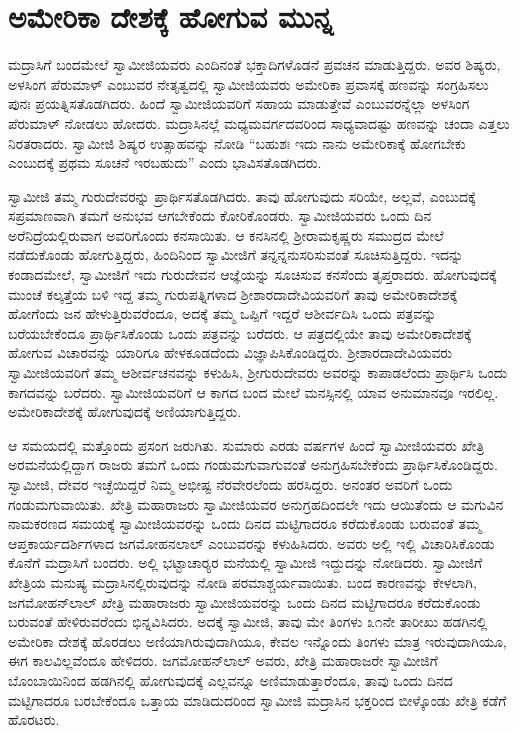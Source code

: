 
\chapter{ಅಮೇರಿಕಾ ದೇಶಕ್ಕೆ ಹೋಗುವ ಮುನ್ನ }

 ಮದ್ರಾಸಿಗೆ ಬಂದಮೇಲೆ ಸ್ವಾಮೀಜಿಯವರು ಎಂದಿನಂತೆ ಭಕ್ತಾದಿಗಳೊಡನೆ ಪ್ರವಚನ ಮಾಡುತ್ತಿದ್ದರು. ಅವರ ಶಿಷ್ಯರು, ಅಳಸಿಂಗ ಪೆರುಮಾಳ್ ಎಂಬುವರ ನೇತೃತ್ವದಲ್ಲಿ ಸ್ವಾಮೀಜಿಯವರು ಅಮೇರಿಕಾ ಪ್ರವಾಸಕ್ಕೆ ಹಣವನ್ನು ಸಂಗ್ರಹಿಸಲು ಪುನಃ ಪ್ರಯತ್ನಿಸತೊಡಗಿದರು. ಹಿಂದೆ ಸ್ವಾಮೀಜಿಯವರಿಗೆ ಸಹಾಯ ಮಾಡುತ್ತೇವೆ ಎಂಬುವರನ್ನೆಲ್ಲಾ ಅಳಸಿಂಗ ಪೆರುಮಾಳ್ ನೋಡಲು ಹೋದರು. ಮದ್ರಾಸಿನಲ್ಲೆ ಮಧ್ಯಮವರ್ಗದವರಿಂದ ಸಾಧ್ಯವಾದಷ್ಟು ಹಣವನ್ನು ಚಂದಾ ಎತ್ತಲು ನಿರತರಾದರು. ಸ್ವಾಮೀಜಿ ಶಿಷ್ಯರ ಉತ್ಸಾಹವನ್ನು ನೋಡಿ “ಬಹುಶಃ ಇದು ನಾನು ಅಮೇರಿಕಾಕ್ಕೆ ಹೋಗಬೇಕು ಎಂಬುದಕ್ಕೆ ಪ್ರಥಮ ಸೂಚನೆ ಇರಬಹುದು” ಎಂದು ಭಾವಿಸತೊಡಗಿದರು. 

 ಸ್ವಾಮೀಜಿ ತಮ್ಮ ಗುರುದೇವರನ್ನು ಪ್ರಾರ್ಥಿಸತೊಡಗಿದರು. ತಾವು ಹೋಗುವುದು ಸರಿಯೇ, ಅಲ್ಲವೆ, ಎಂಬುದಕ್ಕೆ ಸಪ್ರಮಾಣವಾಗಿ ತಮಗೆ ಅನುಭವ ಆಗಬೇಕೆಂದು ಕೋರಿಕೊಂಡರು. ಸ್ವಾಮೀಜಿಯವರು ಒಂದು ದಿನ ಅರೆನಿದ್ರೆಯಲ್ಲಿರುವಾಗ ಅವರಿಗೊಂದು ಕನಸಾಯಿತು. ಆ ಕನಸಿನಲ್ಲಿ ಶ‍್ರೀರಾಮಕೃಷ್ಣರು ಸಮುದ್ರದ ಮೇಲೆ ನಡೆದುಕೊಂಡು ಹೋಗುತ್ತಿದ್ದರು, ಹಿಂದಿನಿಂದ ಸ್ವಾಮೀಜಿಗೆ ತನ್ನನ್ನನುಸರಿಸುವಂತೆ ಸೂಚಿಸುತ್ತಿದ್ದರು. ಇದನ್ನು ಕಂಡಾದಮೇಲೆ, ಸ್ವಾಮೀಜಿಗೆ ಇದು ಗುರುದೇವನ ಆಜ್ಞೆಯನ್ನು ಸೂಚಿಸುವ ಕನಸೆಂದು ತೃಪ್ತರಾದರು. ಹೋಗುವುದಕ್ಕೆ ಮುಂಚೆ ಕಲ್ಕತ್ತೆಯ ಬಳಿ ಇದ್ದ ತಮ್ಮ ಗುರುಪತ್ನಿಗಳಾದ ಶ‍್ರೀಶಾರದಾದೇವಿಯವರಿಗೆ ತಾವು ಅಮೇರಿಕಾದೇಶಕ್ಕೆ ಹೋಗೆಂದು ಜನ ಹೇಳುತ್ತಿರುವರೆಂದೂ, ಅದಕ್ಕೆ ತಮ್ಮ ಒಪ್ಪಿಗೆ ಇದ್ದರೆ ಆಶೀರ್ವದಿಸಿ ಒಂದು ಪತ್ರವನ್ನು ಬರೆಯಬೇಕೆಂದೂ ಪ್ರಾರ್ಥಿಸಿಕೊಂಡು ಒಂದು ಪತ್ರವನ್ನು ಬರೆದರು. ಆ ಪತ್ರದಲ್ಲಿಯೇ ತಾವು ಅಮೇರಿಕಾದೇಶಕ್ಕೆ ಹೋಗುವ ವಿಚಾರವನ್ನು ಯಾರಿಗೂ ಹೇಳಕೂಡದೆಂದು ವಿಜ್ಞಾಪಿಸಿಕೊಂಡಿದ್ದರು. ಶ‍್ರೀಶಾರದಾದೇವಿಯವರು ಸ್ವಾಮೀಜಿಯವರಿಗೆ ತಮ್ಮ ಆಶೀರ್ವಚನವನ್ನು ಕಳುಹಿಸಿ, ಶ‍್ರೀಗುರುದೇವರು ಅವರನ್ನು ಕಾಪಾಡಲೆಂದು ಪ್ರಾರ್ಥಿಸಿ ಒಂದು ಕಾಗದವನ್ನು ಬರೆದರು. ಸ್ವಾಮೀಜಿಯವರಿಗೆ ಆ ಕಾಗದ ಬಂದ ಮೇಲೆ ಮನಸ್ಸಿನಲ್ಲಿ ಯಾವ ಅನುಮಾನವೂ ಇರಲಿಲ್ಲ. ಅಮೇರಿಕಾದೇಶಕ್ಕೆ ಹೋಗುವುದಕ್ಕೆ ಅಣಿಯಾಗುತ್ತಿದ್ದರು. 

 ಆ ಸಮಯದಲ್ಲಿ ಮತ್ತೊಂದು ಪ್ರಸಂಗ ಜರುಗಿತು. ಸುಮಾರು ಎರಡು ವರ್ಷಗಳ ಹಿಂದೆ ಸ್ವಾಮೀಜಿಯವರು ಖೇತ್ರಿ ಅರಮನೆಯಲ್ಲಿದ್ದಾಗ ರಾಜರು ತಮಗೆ ಒಂದು ಗಂಡುಮಗುವಾಗುವಂತೆ ಅನುಗ್ರಹಿಸಬೇಕೆಂದು ಪ್ರಾರ್ಥಿಸಿಕೊಂಡಿದ್ದರು. ಸ್ವಾಮೀಜಿ, ದೇವರ ಇಚ್ಛೆಯಿದ್ದರೆ ನಿಮ್ಮ ಅಭೀಷ್ಟ ನೆರವೇರಲೆಂದು ಹರಸಿದ್ದರು. ಅನಂತರ ಅವರಿಗೆ ಒಂದು ಗಂಡುಮಗುವಾಯಿತು. ಖೇತ್ರಿ ಮಹಾರಾಜರು ಸ್ವಾಮೀಜಿಯವರ ಅನುಗ್ರಹದಿಂದಲೇ ಇದು ಆಯಿತೆಂದು ಆ ಮಗುವಿನ ನಾಮಕರಣದ ಸಮಯಕ್ಕೆ ಸ್ವಾಮೀಜಿಯವರನ್ನು ಒಂದು ದಿನದ ಮಟ್ಟಿಗಾದರೂ ಕರೆದುಕೊಂಡು ಬರುವಂತೆ ತಮ್ಮ ಆಪ್ತಕಾರ್ಯದರ್ಶಿಗಳಾದ ಜಗಮೋಹನಲಾಲ್ ಎಂಬುವರನ್ನು ಕಳುಹಿಸಿದರು. ಅವರು ಅಲ್ಲಿ ಇಲ್ಲಿ ವಿಚಾರಿಸಿಕೊಂಡು ಕೊನೆಗೆ ಮದ್ರಾಸಿಗೆ ಬಂದರು. ಅಲ್ಲಿ ಭಟ್ಟಾಚಾರ‍್ಯರ ಮನೆಯಲ್ಲಿ ಸ್ವಾಮೀಜಿ ಇದ್ದುದನ್ನು ನೋಡಿದರು. ಸ್ವಾಮೀಜಿಗೆ ಖೇತ್ರಿಯ ಮನುಷ್ಯ ಮದ್ರಾಸಿನಲ್ಲಿರುವುದನ್ನು ನೋಡಿ ಪರಮಾಶ್ಚರ್ಯವಾಯಿತು. ಬಂದ ಕಾರಣವನ್ನು ಕೇಳಲಾಗಿ, ಜಗಮೋಹನ್‍ಲಾಲ್ ಖೇತ್ರಿ ಮಹಾರಾಜರು ಸ್ವಾಮೀಜಿಯವರನ್ನು ಒಂದು ದಿನದ ಮಟ್ಟಿಗಾದರೂ ಕರೆದುಕೊಂಡು ಬರುವಂತೆ ಹೇಳಿರುವರೆಂದು ಭಿನ್ನವಿಸಿದರು. ಅದಕ್ಕೆ ಸ್ವಾಮೀಜಿ, ತಾವು ಮೇ ತಿಂಗಳು ೩೧ನೇ ತಾರೀಖು ಹಡಗಿನಲ್ಲಿ ಅಮೇರಿಕಾ ದೇಶಕ್ಕೆ ಹೊರಡಲು ಅಣಿಯಾಗಿರುವುದಾಗಿಯೂ, ಕೇವಲ ಇನ್ನೊಂದು ತಿಂಗಳು ಮಾತ್ರ ಇರುವುದಾಗಿಯೂ, ಈಗ ಕಾಲವಿಲ್ಲವೆಂದೂ ಹೇಳಿದರು. ಜಗಮೋಹನ್‍ಲಾಲ್ ಅವರು, ಖೇತ್ರಿ ಮಹಾರಾಜರೇ ಸ್ವಾಮೀಜಿಗೆ ಬೊಂಬಾಯಿನಿಂದ ಹಡಗಿನಲ್ಲಿ ಹೋಗುವುದಕ್ಕೆ ಎಲ್ಲವನ್ನೂ ಅಣಿಮಾಡುತ್ತಾರೆಂದೂ, ತಾವು ಒಂದು ದಿನದ ಮಟ್ಟಿಗಾದರೂ ಬರಬೇಕೆಂದೂ ಒತ್ತಾಯ ಮಾಡಿದುದರಿಂದ ಸ್ವಾಮೀಜಿ ಮದ್ರಾಸಿನ ಭಕ್ತರಿಂದ ಬೀಳ್ಕೊಂಡು ಖೇತ್ರಿ ಕಡೆಗೆ ಹೊರಟರು. 

